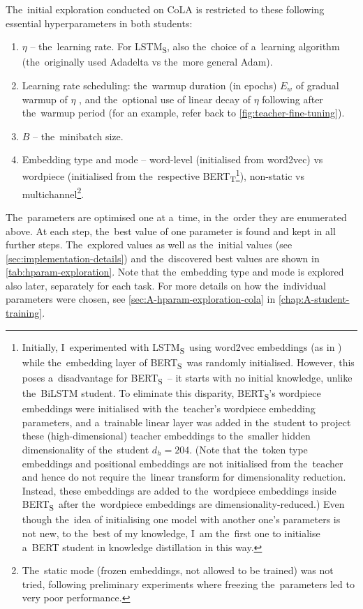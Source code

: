 \documentclass[bsc,frontabs,singlespacing,parskip,deptreport]{infthesis}
\def\BERTT{BERT\textsubscript{T}}
\def\BERTS{BERT\textsubscript{S}}
\def\LSTMS{LSTM\textsubscript{S}}
\begin{document}
{{    The~initial exploration conducted on CoLA is restricted to these following essential hyperparameters in both students:
    \begin{enumerate}
      \item $\eta$ -- the~learning rate. For \LSTMS, also the~choice of a~learning algorithm (the~originally used Adadelta vs the~more general Adam).
      \item Learning rate scheduling: the~warmup duration (in epochs) $E_{w}$ of gradual warmup of $\eta$ \citep{Goyal_2017}, and the~optional use of linear decay of $\eta$ following after the~warmup period (for an example, refer back to \autoref{fig:teacher-fine-tuning}).
      \item $B$ -- the~minibatch size.
      \item Embedding type and mode -- word-level (initialised from word2vec) vs wordpiece (initialised from the~respective \BERTT\footnote{Initially, I~experimented with \LSTMS~using word2vec embeddings (as in \citet{Tang_2019b,Tang_2019a}) while the~embedding layer of \BERTS~was randomly initialised.
      However, this poses a~disadvantage for \BERTS~-- it starts with no initial knowledge, unlike the~BiLSTM student.
      To eliminate this disparity, \BERTS's wordpiece embeddings were initialised with the~teacher's wordpiece embedding parameters, and a~trainable linear layer was added in the~student to project these (high-dimensional) teacher embeddings to the~smaller hidden dimensionality of the~student $d_h=204$.
      (Note that the~token type embeddings and positional embeddings are not initialised from the~teacher and hence do not require the~linear transform for dimensionality reduction.
      Instead, these embeddings are added to the~wordpiece embeddings inside \BERTS~after the~wordpiece embeddings are dimensionality-reduced.)
      Even though the~idea of initialising one model with another one's parameters is not new, to the~best of my knowledge, I~am the~first one to initialise a~BERT student in knowledge distillation in this way.}), non-static vs multichannel\footnote{The~static mode (frozen embeddings, not allowed to be trained) was not tried, following preliminary experiments where freezing the~parameters led to very poor performance.}.
    \end{enumerate}

    The~parameters are optimised one at a~time, in the~order they are enumerated above. At each step, the~best value of one parameter is found and kept in all further steps. The~explored values as well as the~initial values (see \autoref{sec:implementation-details}) and the~discovered best values are shown in \autoref{tab:hparam-exploration}. Note that the~embedding type and mode is explored also later, separately for each task.
    For more details on how the~individual parameters were chosen, see \autoref{sec:A-hparam-exploration-cola} in \autoref{chap:A-student-training}.

}}
\end{document}
